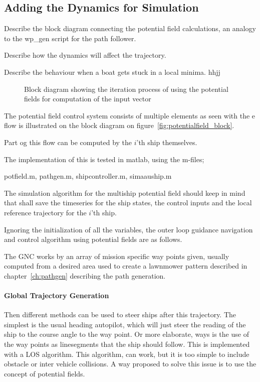 \subsection{Adding the Dynamics for Simulation}
Describe the block diagram connecting the potential field calculations,
an analogy to the wp\_gen script for the path follower.

Describe how the dynamics will affect the trajectory.

Describe the behaviour when a boat gets stuck in a local minima. hhjj

\begin{figure}[htbp]
\centering

\caption{Block diagram showing the iteration process of using the
potential fields for computation of the input vector}
\label{fig:potentialfield_block}
\end{figure}

The potential field control system consists of multiple elements
as seen with the e flow is illustrated on the block diagram on
figure~\vref{fig:potentialfield_block}.

Part og this flow can be computed by the $i$'th ship themselves.


The implementation of this is tested in matlab, using the m-files;

potfield.m, pathgen.m, shipcontroller.m, simaauship.m

The simulation algorithm for the multiship potential field should keep
in mind that shall save the timeseries for the ship states, the
control inputs and the local reference trajectory for the $i$'th ship.

Ignoring the initialization of all the variables, the outer loop
guidance navigation and control algorithm using potential fields are
as follows.

The \ac{GNC} works by an array of mission specific way points given,
usually computed from a desired area used to create a lawnmower
pattern described in chapter~\vref{ch:pathgen} describing the path
generation.

\paragraph{Global Trajectory Generation}
Then different methods can be used to steer ships after this
trajectory. The simplest is the usual heading autopilot, which will
just steer the reading of the ship to the course angle to the
way point. Or more elaborate, ways is the use of the way points as
linesegments that the ship should follow. This is implemented with a
\ac{LOS} algorithm. This algorithm, can work, but it is too simple to
include obstacle or inter vehicle collisions. A way proposed to solve
this issue is to use the concept of potential fields.

